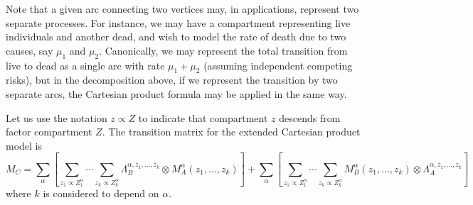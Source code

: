 \documentclass[review]{elsarticle}
\begin{document}
Note that a given arc connecting two vertices may, in applications, represent two separate processes.
For instance, we may have a compartment representing live individuals and another dead, and wish to 
model the rate of death due to two causes, say $\mu_1$ and $\mu_2$.  Canonically, we may represent the total transition
from live to dead as a single arc with rate $\mu_1+\mu_2$ (assuming independent competing risks), but
in the decomposition above, if we represent the transition by two separate arcs, the Cartesian
product formula may be applied in the same way.

Let us use the notation $z\propto Z$ to indicate that
compartment $z$ descends from factor compartment $Z$.
The transition matrix for the extended Cartesian product model is
\begin{dmath*}
M_C = \sum_{\alpha} \left[ \sum_{z_1\propto Z^{\alpha}_1} \cdots \sum_{z_k\propto Z^{\alpha}_k} \Lambda^{\alpha,z_1,\ldots,z_k}_B \otimes M_A^{\alpha}(z_1,\ldots,z_k) \right] +
\sum_{\alpha} \left[ \sum_{z_1\propto Z^{\alpha}_1} \cdots \sum_{z_k\propto Z^{\alpha}_k} M_B^{\alpha}(z_1,\ldots,z_k) \otimes \Lambda^{\alpha,z_1,\ldots,z_k}_A \right]
\end{dmath*}
where $k$ is considered to depend on $\alpha$.
\end{document}
